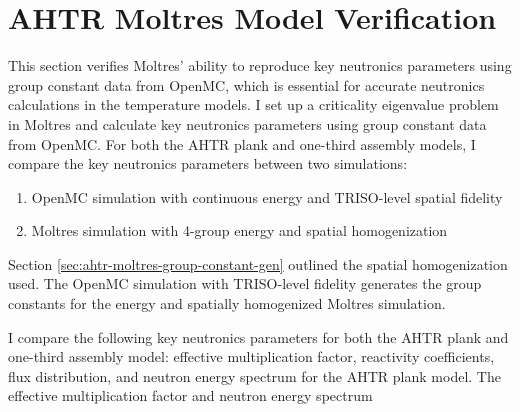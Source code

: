 \section{AHTR Moltres Model Verification}
\label{sec:ahtr_model_verification}
This section verifies Moltres' ability to reproduce key neutronics parameters 
using group constant data from OpenMC, which is essential for accurate neutronics 
calculations in the temperature models.
I set up a criticality eigenvalue problem in Moltres and calculate key neutronics 
parameters using group constant data from OpenMC. 
For both the \gls{AHTR} plank and one-third assembly models, I compare the key neutronics 
parameters between two simulations:
\begin{enumerate}
    \item OpenMC simulation with continuous energy and TRISO-level spatial fidelity 
    \item Moltres simulation with 4-group energy and spatial homogenization
\end{enumerate}
Section \ref{sec:ahtr-moltres-group-constant-gen} outlined the spatial homogenization used.
The OpenMC simulation with TRISO-level fidelity generates the group constants for the 
energy and spatially homogenized Moltres simulation. 

I compare the following key neutronics parameters for both the \gls{AHTR} plank 
and one-third assembly model: effective multiplication factor, reactivity coefficients, 
flux distribution, and neutron energy spectrum for the \gls{AHTR} plank model.  
The effective multiplication factor and neutron energy spectrum 

